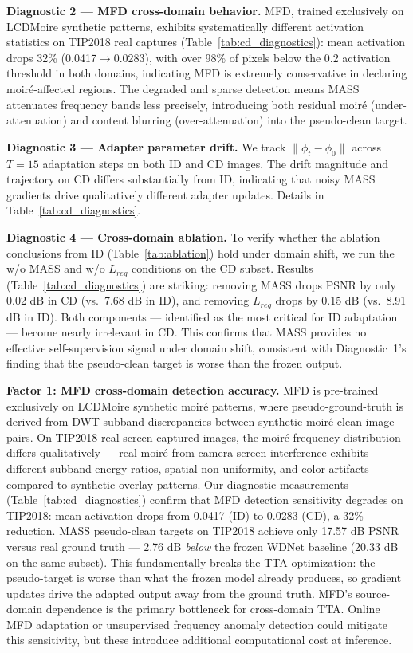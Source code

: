 \documentclass[10pt,twocolumn,letterpaper]{article}
\begin{document}
\noindent\textbf{Diagnostic 2 --- MFD cross-domain behavior.} MFD, trained exclusively on LCDMoire synthetic patterns, exhibits systematically different activation statistics on TIP2018 real captures (Table~\ref{tab:cd_diagnostics}): mean activation drops 32\% (0.0417$\to$0.0283), with over 98\% of pixels below the 0.2 activation threshold in both domains, indicating MFD is extremely conservative in declaring moir\'{e}-affected regions. The degraded and sparse detection means MASS attenuates frequency bands less precisely, introducing both residual moir\'{e} (under-attenuation) and content blurring (over-attenuation) into the pseudo-clean target.

\noindent\textbf{Diagnostic 3 --- Adapter parameter drift.} We track $\|\phi_t - \phi_0\|$ across $T=15$ adaptation steps on both ID and CD images. The drift magnitude and trajectory on CD differs substantially from ID, indicating that noisy MASS gradients drive qualitatively different adapter updates. Details in Table~\ref{tab:cd_diagnostics}.

\noindent\textbf{Diagnostic 4 --- Cross-domain ablation.} To verify whether the ablation conclusions from ID (Table~\ref{tab:ablation}) hold under domain shift, we run the w/o MASS and w/o $L_{reg}$ conditions on the CD subset. Results (Table~\ref{tab:cd_diagnostics}) are striking: removing MASS drops PSNR by only 0.02 dB in CD (vs.\ 7.68 dB in ID), and removing $L_{reg}$ drops by 0.15 dB (vs.\ 8.91 dB in ID). Both components --- identified as the most critical for ID adaptation --- become nearly irrelevant in CD. This confirms that MASS provides no effective self-supervision signal under domain shift, consistent with Diagnostic~1's finding that the pseudo-clean target is worse than the frozen output.
\smallskip

\textbf{Factor 1: MFD cross-domain detection accuracy.} MFD is pre-trained exclusively on LCDMoire synthetic moir\'{e} patterns, where pseudo-ground-truth is derived from DWT subband discrepancies between synthetic moir\'{e}-clean image pairs. On TIP2018 real screen-captured images, the moir\'{e} frequency distribution differs qualitatively --- real moir\'{e} from camera-screen interference exhibits different subband energy ratios, spatial non-uniformity, and color artifacts compared to synthetic overlay patterns. Our diagnostic measurements (Table~\ref{tab:cd_diagnostics}) confirm that MFD detection sensitivity degrades on TIP2018: mean activation drops from 0.0417 (ID) to 0.0283 (CD), a 32\% reduction. MASS pseudo-clean targets on TIP2018 achieve only 17.57 dB PSNR versus real ground truth --- 2.76 dB \textit{below} the frozen WDNet baseline (20.33 dB on the same subset). This fundamentally breaks the TTA optimization: the pseudo-target is worse than what the frozen model already produces, so gradient updates drive the adapted output away from the ground truth. MFD's source-domain dependence is the primary bottleneck for cross-domain TTA. Online MFD adaptation or unsupervised frequency anomaly detection could mitigate this sensitivity, but these introduce additional computational cost at inference.
\end{document}
